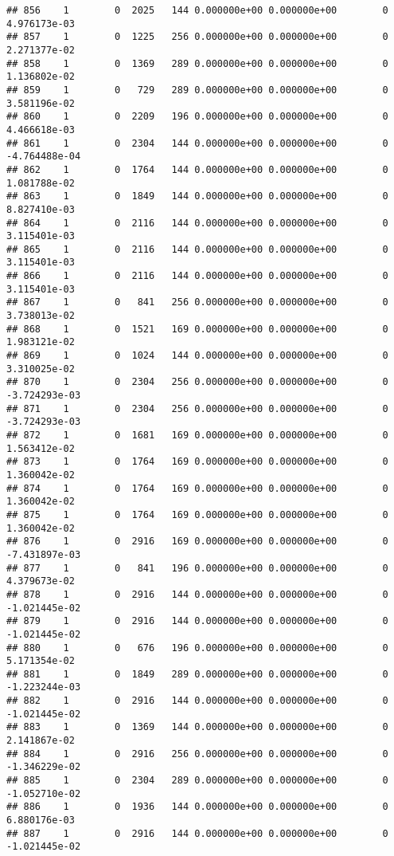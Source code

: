 \documentclass[
]{article}
\begin{document}
\begin{enumerate}
\begin{verbatim}
## 856    1        0  2025   144 0.000000e+00 0.000000e+00        0  4.976173e-03
## 857    1        0  1225   256 0.000000e+00 0.000000e+00        0  2.271377e-02
## 858    1        0  1369   289 0.000000e+00 0.000000e+00        0  1.136802e-02
## 859    1        0   729   289 0.000000e+00 0.000000e+00        0  3.581196e-02
## 860    1        0  2209   196 0.000000e+00 0.000000e+00        0  4.466618e-03
## 861    1        0  2304   144 0.000000e+00 0.000000e+00        0 -4.764488e-04
## 862    1        0  1764   144 0.000000e+00 0.000000e+00        0  1.081788e-02
## 863    1        0  1849   144 0.000000e+00 0.000000e+00        0  8.827410e-03
## 864    1        0  2116   144 0.000000e+00 0.000000e+00        0  3.115401e-03
## 865    1        0  2116   144 0.000000e+00 0.000000e+00        0  3.115401e-03
## 866    1        0  2116   144 0.000000e+00 0.000000e+00        0  3.115401e-03
## 867    1        0   841   256 0.000000e+00 0.000000e+00        0  3.738013e-02
## 868    1        0  1521   169 0.000000e+00 0.000000e+00        0  1.983121e-02
## 869    1        0  1024   144 0.000000e+00 0.000000e+00        0  3.310025e-02
## 870    1        0  2304   256 0.000000e+00 0.000000e+00        0 -3.724293e-03
## 871    1        0  2304   256 0.000000e+00 0.000000e+00        0 -3.724293e-03
## 872    1        0  1681   169 0.000000e+00 0.000000e+00        0  1.563412e-02
## 873    1        0  1764   169 0.000000e+00 0.000000e+00        0  1.360042e-02
## 874    1        0  1764   169 0.000000e+00 0.000000e+00        0  1.360042e-02
## 875    1        0  1764   169 0.000000e+00 0.000000e+00        0  1.360042e-02
## 876    1        0  2916   169 0.000000e+00 0.000000e+00        0 -7.431897e-03
## 877    1        0   841   196 0.000000e+00 0.000000e+00        0  4.379673e-02
## 878    1        0  2916   144 0.000000e+00 0.000000e+00        0 -1.021445e-02
## 879    1        0  2916   144 0.000000e+00 0.000000e+00        0 -1.021445e-02
## 880    1        0   676   196 0.000000e+00 0.000000e+00        0  5.171354e-02
## 881    1        0  1849   289 0.000000e+00 0.000000e+00        0 -1.223244e-03
## 882    1        0  2916   144 0.000000e+00 0.000000e+00        0 -1.021445e-02
## 883    1        0  1369   144 0.000000e+00 0.000000e+00        0  2.141867e-02
## 884    1        0  2916   256 0.000000e+00 0.000000e+00        0 -1.346229e-02
## 885    1        0  2304   289 0.000000e+00 0.000000e+00        0 -1.052710e-02
## 886    1        0  1936   144 0.000000e+00 0.000000e+00        0  6.880176e-03
## 887    1        0  2916   144 0.000000e+00 0.000000e+00        0 -1.021445e-02

\end{verbatim}
\end{enumerate}
\end{document}
